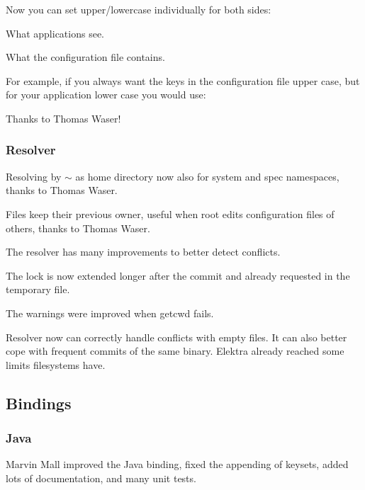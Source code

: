 Now you can set upper/lowercase individually for both sides\+:


\begin{DoxyEnumerate}
\item What applications see.
\item What the configuration file contains.
\end{DoxyEnumerate}

For example, if you always want the keys in the configuration file upper case, but for your application lower case you would use\+: 


Thanks to Thomas Waser!

\subsubsection*{Resolver}

Resolving by $\sim$ as home directory now also for system and spec namespaces, thanks to Thomas Waser.

Files keep their previous owner, useful when root edits configuration files of others, thanks to Thomas Waser.

The resolver has many improvements to better detect conflicts.

The lock is now extended longer after the commit and already requested in the temporary file.

The warnings were improved when {\ttfamily getcwd} fails.

Resolver now can correctly handle conflicts with empty files. It can also better cope with frequent commits of the same binary. Elektra already reached some limits filesystems have.

\subsection*{Bindings}

\subsubsection*{Java}

Marvin Mall improved the Java binding, fixed the appending of keysets, added lots of documentation, and many unit tests.

